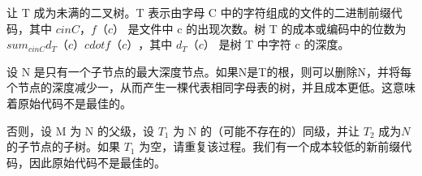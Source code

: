 \documentclass[a4paper, justified]{tufte-handout}
\begin{document}
\begin{problem}[TC 16.3-2]
\end{problem}

\begin{solution}
	让 T 成为未满的二叉树。T 表示由字母 C 中的字符组成的文件的二进制前缀代码，其中 $c in C$，$f（c）$ 是文件中 c 的出现次数。树 T 的成本或编码中的位数为 $sum_{c in C} d_T（c） cdot f（c）$，其中 $d_T（c）$ 是树 T 中字符 c 的深度。


	设 N 是只有一个子节点的最大深度节点。如果N是T的根，则可以删除N，并将每个节点的深度减少一，从而产生一棵代表相同字母表的树，并且成本更低。这意味着原始代码不是最佳的。


	否则，设 M 为 N 的父级，设 $T_1$ 为 N 的（可能不存在的）同级，并让 $T_2$ 成为$N$ 的子节点的子树。如果 $T_1$ 为空，请重复该过程。我们有一个成本较低的新前缀代码，因此原始代码不是最佳的。
\end{solution}

\begin{problem}[TC 16.3-5]
\end{problem}
\end{document}
